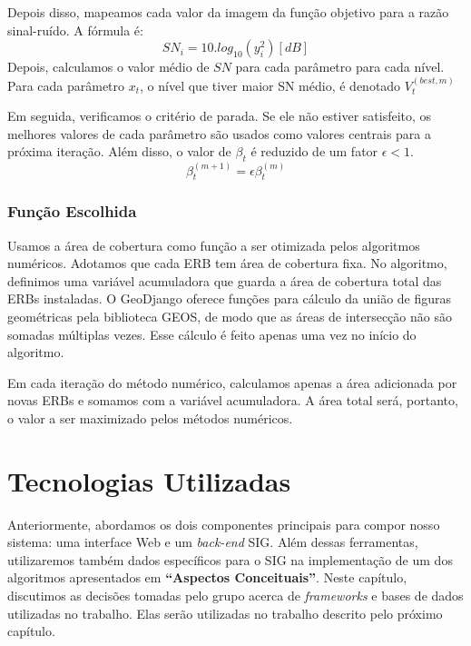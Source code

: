\documentclass[]{politex}
\begin{document}
Depois disso, mapeamos cada valor da imagem da função objetivo para a razão
sinal-ruído. A fórmula é:
\begin{equation*}
    SN_i = 10.log_{10}(y_i^2) [dB]
\end{equation*}
Depois, calculamos o valor médio de $SN$ para cada parâmetro para cada nível.
Para cada parâmetro $x_t$, o nível que tiver maior SN médio, é denotado
$V_t^{(best, m)}$

Em seguida, verificamos o critério de parada. Se ele não estiver satisfeito, os
melhores valores de cada parâmetro são usados como valores centrais para a
próxima iteração. Além disso, o valor de $\beta_t$ é reduzido de um fator $\epsilon < 1$.
\begin{equation*}
    \beta_t^{(m+1)} = \epsilon\beta_t^{(m)}
\end{equation*}

\subsection{Função Escolhida}
Usamos a área de cobertura como função a ser otimizada pelos algoritmos
numéricos. Adotamos que cada ERB tem área de cobertura fixa.
No algoritmo, definimos uma variável acumuladora que guarda a área de cobertura
total das ERBs instaladas. O GeoDjango oferece funções para cálculo da união
de figuras geométricas pela biblioteca GEOS, de modo que as áreas de intersecção
não são somadas múltiplas vezes. Esse cálculo é feito apenas uma vez no início
do algoritmo.

Em cada iteração do método numérico, calculamos apenas a área adicionada por
novas ERBs e somamos com a variável acumuladora. A área total será, portanto, o
valor a ser maximizado pelos métodos numéricos.

\chapter{Tecnologias Utilizadas}

Anteriormente, abordamos os dois componentes principais para compor nosso
sistema: uma interface Web e um \textit{back-end} SIG. Além dessas ferramentas, utilizaremos
também dados específicos para o SIG na implementação de um dos algoritmos
apresentados em \textbf{``Aspectos Conceituais''}. Neste capítulo, discutimos as
decisões tomadas pelo grupo acerca de \emph{frameworks} e bases de dados
utilizadas no trabalho. Elas serão utilizadas no trabalho descrito pelo próximo
capítulo.
\end{document}
